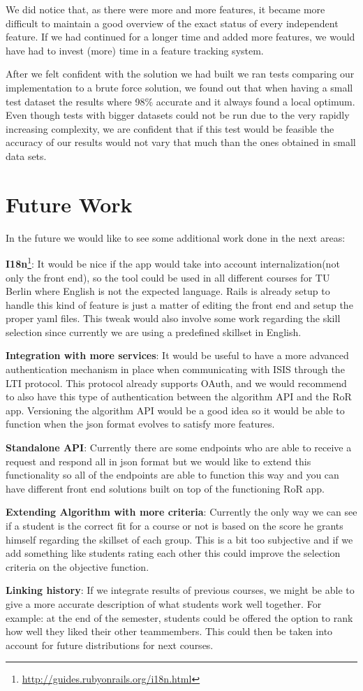 We did notice that, as there were more and more features, it became more difficult to maintain a good overview of the exact status of every independent feature. If we had continued for a longer time and added more features, we would have had to invest (more) time in a feature tracking system.

After we felt confident with the solution we had built we ran tests comparing our implementation to a brute force solution, we found out that when having a small test dataset the results where 98\% accurate and it always found a local optimum. Even though tests with bigger datasets could not be run due to the very rapidly increasing complexity, we are confident that if this test would be feasible the accuracy of our results would not vary that much than the ones obtained in small data sets.

\section{Future Work}
In the future we would like to see some additional work done in the next areas:

\textbf{I18n}\footnote{\url{http://guides.rubyonrails.org/i18n.html}}: It would be nice if the app would take into account internalization(not only the front end), so the tool could be used in all different courses for TU Berlin where English is not the expected language. Rails is already setup to handle this kind of feature is just a matter of editing the front end and setup the proper yaml files. This tweak would also involve some work regarding the skill selection since currently we are using a predefined skillset in English.

\textbf{Integration with more services}: It would be useful to have a more advanced authentication mechanism in place when communicating with ISIS through the LTI protocol. This protocol already supports OAuth, and we would recommend to also have this type of authentication between the algorithm API and the RoR app. Versioning the algorithm API would be a good idea so it would be able to function when the json format evolves to satisfy more features.
 
\textbf{Standalone API}: Currently there are some endpoints who are able to receive a request and respond all in json format but we would like to extend this functionality so all of the endpoints are able to function this way and you can have different front end solutions built on top of the functioning RoR app.

\textbf{Extending Algorithm with more criteria}: Currently the only way we can see if a student is the correct fit for a course or not is based on the score he grants himself regarding the skillset of each group. This is a bit too subjective and if we add something like students rating each other this could improve the selection criteria on the objective function.

\textbf{Linking history}: If we integrate results of previous courses, we might be able to give a more accurate description of what students work well together. For example: at the end of the semester, students could be offered the option to rank how well they liked their other teammembers. This could then be taken into account for future distributions for next courses.